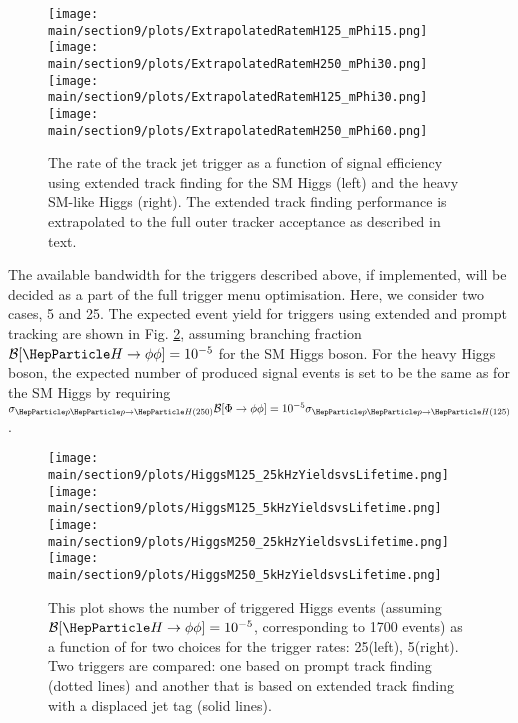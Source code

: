 \begin{figure}[hbtp]
  \centering
    \texttt{[image: \\main/section9/plots/ExtrapolatedRatemH125\_mPhi15.png]}
    \texttt{[image: \\main/section9/plots/ExtrapolatedRatemH250\_mPhi30.png]}\\
    \texttt{[image: \\main/section9/plots/ExtrapolatedRatemH125\_mPhi30.png]}
    \texttt{[image: \\main/section9/plots/ExtrapolatedRatemH250\_mPhi60.png]}
    \caption{The rate of the track jet \HT trigger as a function of signal efficiency using extended track finding for the SM Higgs (left)
    and the heavy SM-like Higgs (right). The extended track finding performance is extrapolated to the full outer tracker acceptance as described in text.}
    \label{fig:reff_dispextra}
\end{figure}

The available bandwidth for the triggers described above, if implemented, will be decided as a part of the full trigger menu optimisation.
Here, we consider two cases, 5 and 25\UkHz. The expected event yield for triggers using extended and prompt tracking are shown in Fig. \ref{fig:money},
assuming branching fraction $\mathcal{B}[\Hphiphi] = 10^{-5}$ for the SM Higgs boson.
For the heavy Higgs boson, the expected number of produced signal events is set to be the same as for the SM Higgs by requiring
$\sigma_{\pp\to \PH(250)} \mathcal{B}[\BSMHphiphi] = 10^{-5} \sigma_{\pp\to \PH(125)}$.

\begin{figure}[hbtp]
  \centering
    \texttt{[image: \\main/section9/plots/HiggsM125\_25kHzYieldsvsLifetime.png]}
    \texttt{[image: \\main/section9/plots/HiggsM125\_5kHzYieldsvsLifetime.png]}\\
    \texttt{[image: \\main/section9/plots/HiggsM250\_25kHzYieldsvsLifetime.png]}
    \texttt{[image: \\main/section9/plots/HiggsM250\_5kHzYieldsvsLifetime.png]}
    \caption{This plot shows the number of triggered Higgs events (assuming ${\mathcal{B}[\Hphiphi] = 10^{-5}}$, corresponding to 
1700 events) as a function of \ctau for two choices for the trigger rates: 25\UkHz (left), 5\UkHz (right).
Two triggers are compared: one based on prompt track finding (dotted lines) and another that is based on extended track finding 
with a displaced jet tag (solid lines). }
    \label{fig:money}
\end{figure}

